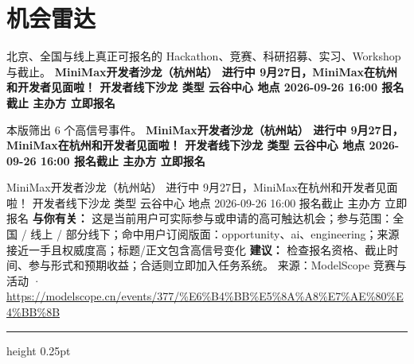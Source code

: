 \documentclass[10.5pt]{ctexart}
\begin{document}
\section*{机会雷达}
{\color{ormuted} 北京、全国与线上真正可报名的 Hackathon、竞赛、科研招募、实习、Workshop 与截止。}
\vspace{2mm}
{\LARGE\bfseries MiniMax开发者沙龙（杭州站） 进行中 9月27日，MiniMax在杭州和开发者见面啦！ 开发者线下沙龙 类型 云谷中心 地点 2026-09-26 16:00 报名截止 主办方 立即报名}\par
\vspace{1mm}
{\color{ormuted} 本版筛出 6 个高信号事件。}
\vspace{3mm}
{\Large\bfseries MiniMax开发者沙龙（杭州站） 进行中 9月27日，MiniMax在杭州和开发者见面啦！ 开发者线下沙龙 类型 云谷中心 地点 2026-09-26 16:00 报名截止 主办方 立即报名}\par
MiniMax开发者沙龙（杭州站） 进行中 9月27日，MiniMax在杭州和开发者见面啦！ 开发者线下沙龙 类型 云谷中心 地点 2026-09-26 16:00 报名截止 主办方 立即报名
\textbf{与你有关：} 这是当前用户可实际参与或申请的高可触达机会；参与范围：全国 / 线上 / 部分线下；命中用户订阅版面：opportunity、ai、engineering；来源接近一手且权威度高；标题/正文包含高信号变化
\textbf{建议：} 检查报名资格、截止时间、参与形式和预期收益；合适则立即加入任务系统。
{\footnotesize\color{ormuted} 来源：ModelScope 竞赛与活动 · \url{https://modelscope.cn/events/377/%E6%B4%BB%E5%8A%A8%E7%AE%80%E4%BB%8B}}
\vspace{4mm}
\hrule height 0.25pt
\vspace{3mm}
\end{document}
